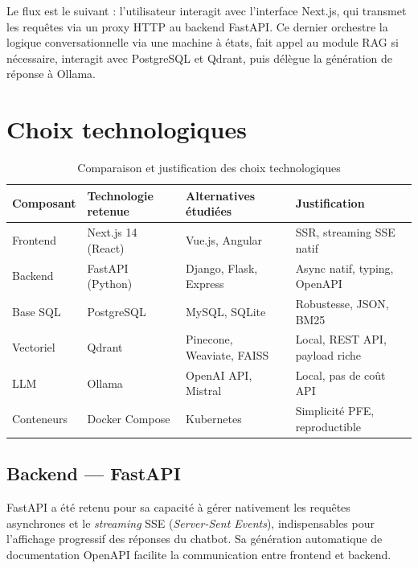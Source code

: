 \documentclass[12pt,a4paper]{report}
\begin{document}
Le flux est le suivant : l'utilisateur interagit avec l'interface Next.js, qui transmet les
requêtes via un proxy HTTP au backend FastAPI. Ce dernier orchestre la logique
conversationnelle via une machine à états, fait appel au module RAG si nécessaire,
interagit avec PostgreSQL et Qdrant, puis délègue la génération de réponse à Ollama.

\section{Choix technologiques}

\begin{table}[H]
\centering
\caption{Comparaison et justification des choix technologiques}
\small
\begin{tabularx}{\textwidth}{|l|X|X|l|}
\hline
\rowcolor{tableheader}
\textbf{Composant} & \textbf{Technologie retenue} & \textbf{Alternatives étudiées} & \textbf{Justification} \\
\hline
Frontend & Next.js 14 (React) & Vue.js, Angular & SSR, streaming SSE natif \\
\hline
Backend & FastAPI (Python) & Django, Flask, Express & Async natif, typing, OpenAPI \\
\hline
Base SQL & PostgreSQL & MySQL, SQLite & Robustesse, JSON, BM25 \\
\hline
Vectoriel & Qdrant & Pinecone, Weaviate, FAISS & Local, REST API, payload riche \\
\hline
LLM & Ollama & OpenAI API, Mistral & Local, pas de coût API \\
\hline
Conteneurs & Docker Compose & Kubernetes & Simplicité PFE, reproductible \\
\hline
\end{tabularx}
\label{tab:techno}
\end{table}

\subsection{Backend — FastAPI}

FastAPI a été retenu pour sa capacité à gérer nativement les requêtes asynchrones et
le \textit{streaming} SSE (\textit{Server-Sent Events}), indispensables pour l'affichage
progressif des réponses du chatbot. Sa génération automatique de documentation OpenAPI
facilite la communication entre frontend et backend.
\end{document}
